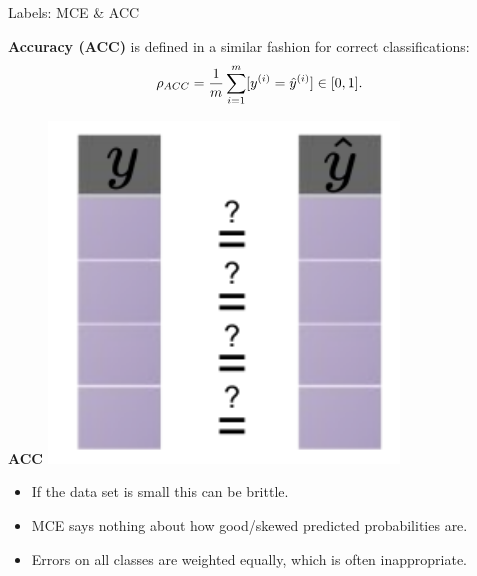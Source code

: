 \begin{vbframe}{Labels: MCE \& ACC}
\begin{minipage}[t]{0.75\textwidth} 
  \small
  \textbf{Accuracy (ACC)} is defined in a similar fashion for correct 
  classifications:
  $$ \rho_{ACC} = \frac{1}{m} \sum_{i = 1}^m [y^{(i)} = \hat{y}^{(i)}] \in [0, 1]. $$
\end{minipage}%
\begin{minipage}[t]{0.25\textwidth}
  \centering
  \begin{center}
    \textbf{ACC}
    \includegraphics[width=0.7\textwidth]
    {figure_man/eval-classif-loss-compare.pdf}
  \end{center}
\end{minipage}

\lz

\begin{itemize}
  \small
  \item If the data set is small this can be brittle.
  \item MCE says nothing about how good/skewed predicted probabilities are.
  \item Errors on all classes are weighted equally, which is often 
  inappropriate.
\end{itemize}

\end{vbframe}



